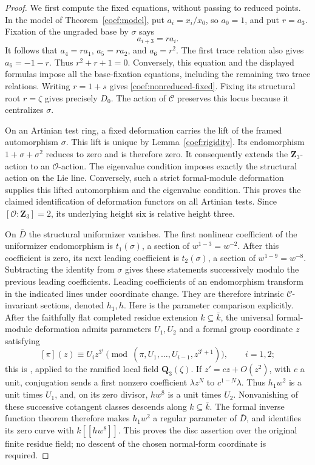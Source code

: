 \documentclass[11pt]{article}
\theoremstyle{definition}
\theoremstyle{remark}
\numberwithin{equation}{section}
\begin{document}
\begin{proof}
We first compute the fixed equations, without passing to reduced
points.  In the model of Theorem~\ref{coef:model}, put
\(a_i=x_i/x_0\), so \(a_0=1\), and put \(r=a_3\).
Fixation of the ungraded base by \(\sigma\) says
\[
 a_{i+3}=r a_i.
\]
It follows that \(a_4=ra_1\), \(a_5=ra_2\), and \(a_6=r^2\).
The first trace relation also gives \(a_6=-1-r\).  Thus
\(r^2+r+1=0\).  Conversely, this equation and the displayed formulas
impose all the base-fixation equations, including the remaining two
trace relations.  Writing \(r=1+s\) gives
\eqref{coef:nonreduced-fixed}.  Fixing its structural root \(r=\zeta\)
gives precisely \(D_0\).  The action of \(\mathcal C\) preserves this
locus because it centralizes \(\sigma\).

On an Artinian test ring, a fixed deformation carries the lift of
the framed automorphism \(\sigma\).  This lift is unique by
Lemma~\ref{coef:rigidity}.  Its endomorphism
\(1+\sigma+\sigma^2\) reduces to zero and is therefore zero.
It consequently extends the \(\mathbf Z_3\)-action to an
\(\mathcal O\)-action.  The eigenvalue condition imposes exactly the
structural action on the Lie line.  Conversely, such a strict
formal-module deformation supplies this lifted automorphism and
the eigenvalue condition.  This proves the claimed identification
of deformation functors on all Artinian tests.
Since \([\mathcal O:\mathbf Z_3]=2\), its underlying height six is relative
height three.

On \(\bar D\) the structural uniformizer vanishes.  The first
nonlinear coefficient of the uniformizer endomorphism is
\(t_1(\sigma)\), a section of \(w^{1-3}=w^{-2}\).
After this coefficient is zero, its next leading coefficient is
\(t_2(\sigma)\), a section of \(w^{1-9}=w^{-8}\).
Subtracting the identity from \(\sigma\) gives these statements
successively modulo the previous leading coefficients.
Leading coefficients of an endomorphism transform in the indicated
lines under coordinate change.  They are therefore intrinsic
\(\mathcal C\)-invariant sections, denoted \(h_1,h\).
Here is the parameter comparison explicitly.  After the faithfully
flat completed residue extension \(k\subseteq\bar k\), the universal
formal-module deformation admits parameters \(U_1,U_2\) and a formal
group coordinate \(z\) satisfying
\begin{equation}\label{coef:height-coordinates}
 [\pi](z)\equiv U_i z^{3^i}
 \pmod{(\pi,U_1,\ldots,U_{i-1},z^{3^i+1})},
 \qquad i=1,2;
\end{equation}
this is \cite[arXiv version, Section~1, Equation~(1.1)]{StrauchTorsion}, applied to
the ramified local field \(\mathbf Q_3(\zeta)\).
If \(z'=cz+O(z^2)\), with \(c\) a unit, conjugation sends a first
nonzero coefficient \(\lambda z^N\) to \(c^{1-N}\lambda\).
Thus \(h_1w^2\) is a unit times \(U_1\), and, on its zero divisor,
\(hw^8\) is a unit times \(U_2\).
Nonvanishing of these successive cotangent classes descends along
\(k\subseteq\bar k\).  The formal inverse function theorem therefore
makes \(h_1w^2\) a regular parameter of \(\bar D\), and identifies
its zero curve with \(k[[hw^8]]\).  This proves the disc assertion
over the original finite residue field; no descent of the chosen
normal-form coordinate is required.


\end{proof}
\end{document}
